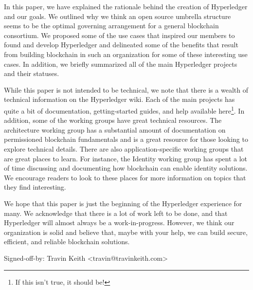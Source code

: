 In this paper, we have explained the rationale behind the creation of Hyperledger and our goals. We outlined why we think an open source umbrella structure seems to be the optimal governing arrangement for a general blockchain consortium. We proposed some of the use cases that inspired our members to found and develop Hyperledger and delineated some of the benefits that result from building blockchain in such an organization for some of these interesting use cases. In addition, we briefly summarized all of the main Hyperledger projects and their statuses.

While this paper is not intended to be technical, we note that there is a wealth of technical information on the Hyperledger wiki. Each of the main projects has quite a bit of documentation, getting-started guides, and help available here\footnote{If this isn't true, it should be!}. In addition, some of the working groups have great technical resources.  The architecture working group has a substantial amount of documentation on permissioned blockchain fundamentals and is a great resource for those looking to explore technical details. There are also application-specific working groups that are great places to learn. For instance, the Identity working group has spent a lot of time discussing and documenting how blockchain can enable identity solutions. We encourage readers to look to these places for more information on topics that they find interesting.   

We hope that this paper is just the beginning of the Hyperledger experience for many. We acknowledge that there is a lot of work left to be done, and that Hyperledger will almost always be a work-in-progress. However, we think our organization is solid and believe that, maybe with your help, we can build secure, efficient, and reliable blockchain solutions.


Signed-off-by: Travin Keith <travin@travinkeith.com>
